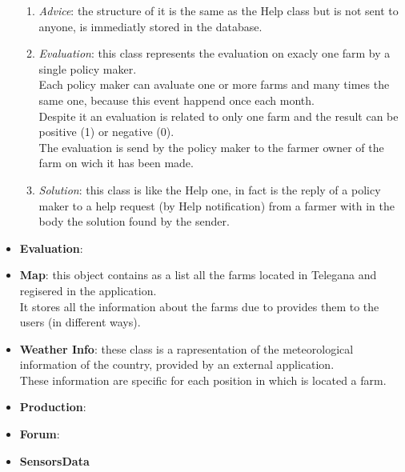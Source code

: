 \begin{itemize}
\begin{enumerate}
            \item \textsl{Advice}: the structure of it is the same as the Help class but is not sent to anyone, is immediatly stored in the database.
            \item \textsl{Evaluation}: this class represents the evaluation on exacly one farm by a single policy maker.\\ Each policy maker can avaluate one or more farms and many times the same one, because this event happend once each month.\\ Despite it an evaluation is related to only one farm and the result can be positive (1) or negative (0).\\ The evaluation is send by the policy maker to the farmer owner of the farm on wich it has been made.
            \item \textsl{Solution}: this class is like the Help one, in fact is the reply of a policy maker to a help request (by Help notification) from a farmer with in the body the solution found by the sender.
        \end{enumerate}
    \item \textbf{Evaluation}:
    \item \textbf{Map}: this object contains as a list all the farms located in Telegana and regisered in the application.\\It stores all the information about the farms due to provides them to the users (in different ways).
    \item \textbf{Weather Info}: these class is a rapresentation of the meteorological information of the country, provided by an external application.\\These information are specific for each position in which is located a farm.
    \item \textbf{Production}:
    \item \textbf{Forum}:
    \item \textbf{SensorsData}
\end{itemize}
